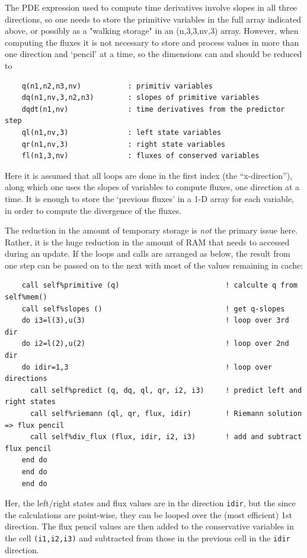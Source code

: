 \documentclass[paper=a4,fontsize=11pt]{scrartcl}
\numberwithin{equation}{section}		%
\numberwithin{figure}{section}			%
\numberwithin{table}{section}				%
\newcommand{\codecolor}{\color{Blue}}
\begin{document}
The PDE expression used to compute time derivatives involve slopes in all three directions, so one needs to store the primitive variables in the full array indicated above, or possibly as a "walking storage" in an (n,3,3,nv,3) array.  However, when computing the fluxes it is not necessary to store and process values in more than one direction and `pencil' at a time, so the dimensions can and should be reduced to
{\codecolor\small\begin{verbatim}
    q(n1,n2,n3,nv)           : primitiv variables
    dq(n1,nv,3,n2,n3)        : slopes of primitive variables
    dqdt(n1,nv)              : time derivatives from the predictor step
    ql(n1,nv,3)              : left state variables
    qr(n1,nv,3)              : right state variables
    fl(n1,3,nv)              : fluxes of conserved variables
\end{verbatim}}
Here it is assumed that all loops are done in the first index (the ``x-direction''), along which one uses the slopes of variables to compute fluxes, one direction at a time. It is enough to store the `previous fluxes' in a 1-D array for each variable, in order to compute the divergence of the fluxes.

The reduction in the amount of temporary storage is \textit{not} the primary issue here.  Rather, it is the huge reduction in the amount of RAM that needs to accessed during an update.  If the loops and calls are arranged as below, the result from one step can be passed on to the next with most of the values remaining in cache:
{\codecolor\small\begin{verbatim}
    call self%primitive (q)                         ! calculte q from self%mem()
    call self%slopes ()                             ! get q-slopes
    do i3=l(3),u(3)                                 ! loop over 3rd dir
    do i2=l(2),u(2)                                 ! loop over 2nd dir
    do idir=1,3                                     ! loop over directions
      call self%predict (q, dq, ql, qr, i2, i3)     ! predict left and right states
      call self%riemann (ql, qr, flux, idir)        ! Riemann solution => flux pencil
      call self%div_flux (flux, idir, i2, i3)       ! add and subtract flux pencil
    end do
    end do
    end do
\end{verbatim}}
Her, the left/right states and flux values are in the direction \verb:idir:, but the since the calculations are point-wise, they can be looped over the (most efficient) 1st direction.   The flux pencil values are then added to the conservative variables in the cell \verb:(i1,i2,i3): and subtracted from those in the previous cell in the \verb:idir: direction.
\end{document}
